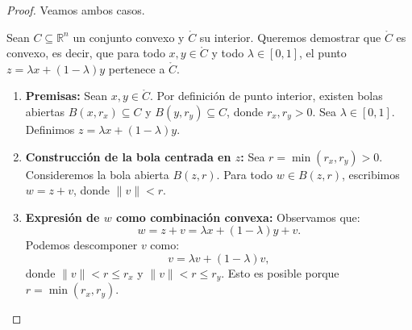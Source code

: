 \documentclass[12pt]{book}
\theoremstyle{definition}
\theoremstyle{plain}
\theoremstyle{remark}
\begin{document}
\begin{proof} Veamos ambos casos.


Sean \( C \subseteq \mathbb{R}^n \) un conjunto convexo y \( \mathring{C} \) su interior. Queremos demostrar que \( \mathring{C} \) es convexo, es decir, que para todo \( x, y \in \mathring{C} \) y todo \( \lambda \in [0,1] \), el punto \( z = \lambda x + (1-\lambda)y \) pertenece a \( \mathring{C} \).

\begin{enumerate}
    \item \textbf{Premisas:}
Sean \( x, y \in \mathring{C} \). Por definición de punto interior, existen bolas abiertas \( B(x, r_x) \subseteq C \) y \( B(y, r_y) \subseteq C \), donde \( r_x, r_y > 0 \).
Sea \( \lambda \in [0,1] \).
Definimos \( z = \lambda x + (1-\lambda)y \).

    \item \textbf{Construcción de la bola centrada en \( z \):}
Sea \( r = \min(r_x, r_y) > 0 \).
Consideremos la bola abierta \( B(z, r) \).
Para todo \( w \in B(z, r) \), escribimos \( w = z + v \), donde \( \|v\| < r \).

    \item \textbf{Expresión de \( w \) como combinación convexa:}
Observamos que:
        \[
        w = z + v = \lambda x + (1-\lambda)y + v.
        \]
Podemos descomponer \( v \) como:
        \[
        v = \lambda v + (1-\lambda)v,
        \]
        donde \( \|v\| < r \leq r_x \) y \( \|v\| < r \leq r_y \). Esto es posible porque \( r = \min(r_x, r_y) \).


\end{enumerate}
\end{proof}
\end{document}
